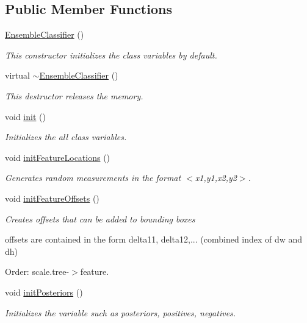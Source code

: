 \subsection*{Public Member Functions}
\begin{DoxyCompactItemize}
\item 
\hyperlink{classtld_1_1EnsembleClassifier_a7ce76942175fecdf2b44be726f1f7a89}{Ensemble\-Classifier} ()
\begin{DoxyCompactList}\small\item\em This constructor initializes the class variables by default. \end{DoxyCompactList}\item 
virtual \hyperlink{classtld_1_1EnsembleClassifier_a71a3976d9dccf15dcdd6a14826d5ec5a}{$\sim$\-Ensemble\-Classifier} ()
\begin{DoxyCompactList}\small\item\em This destructor releases the memory. \end{DoxyCompactList}\item 
void \hyperlink{classtld_1_1EnsembleClassifier_afb0e8ed03adef91257801bf0e3ca73f7}{init} ()
\begin{DoxyCompactList}\small\item\em Initializes the all class variables. \end{DoxyCompactList}\item 
void \hyperlink{classtld_1_1EnsembleClassifier_a3fc444f59e0f23a97f9889e58adaba73}{init\-Feature\-Locations} ()
\begin{DoxyCompactList}\small\item\em Generates random measurements in the format $<$x1,y1,x2,y2$>$. \end{DoxyCompactList}\item 
void \hyperlink{classtld_1_1EnsembleClassifier_a92ddef7701b1062b1f4a53e5cfcd79a2}{init\-Feature\-Offsets} ()
\begin{DoxyCompactList}\small\item\em Creates offsets that can be added to bounding boxes \par
 offsets are contained in the form delta11, delta12,... (combined index of dw and dh) \par
 Order\-: scale.\-tree-\/$>$feature. \end{DoxyCompactList}\item 
void \hyperlink{classtld_1_1EnsembleClassifier_ab342db231d14bbaa892b2664d210e152}{init\-Posteriors} ()
\begin{DoxyCompactList}\small\item\em Initializes the variable such as posteriors, positives, negatives. \end{DoxyCompactList}\item 

\end{DoxyCompactItemize}
